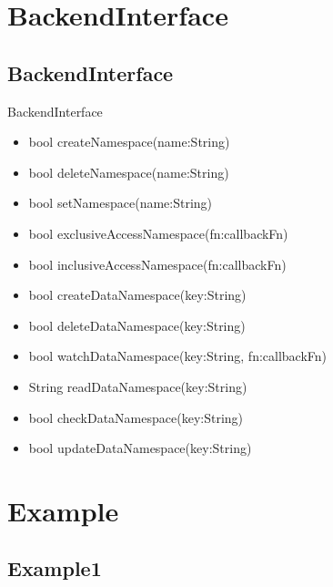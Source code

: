 \documentclass{beamer}
\begin{document}
\section {BackendInterface}
\subsection {BackendInterface}
\begin{frame}
\begin{block}{BackendInterface}
		\begin{itemize}
			\item bool \alert{createNamespace}(name:String)
			\item bool \alert{deleteNamespace}(name:String)
			\item bool \alert{setNamespace}(name:String)
			\item bool \alert{exclusiveAccessNamespace}(fn:callbackFn)
			\item bool \alert{inclusiveAccessNamespace}(fn:callbackFn)
			\item bool \alert{createDataNamespace}(key:String)
			\item bool \alert{deleteDataNamespace}(key:String)
			\item bool \alert{watchDataNamespace}(key:String, fn:callbackFn)
			\item String \alert{readDataNamespace}(key:String)
			\item bool \alert{checkDataNamespace}(key:String)
			\item bool \alert{updateDataNamespace}(key:String)
		\end{itemize}
	\end{block}

\end{frame}





\section {Example}
\subsection {Example1}
\end{document}
